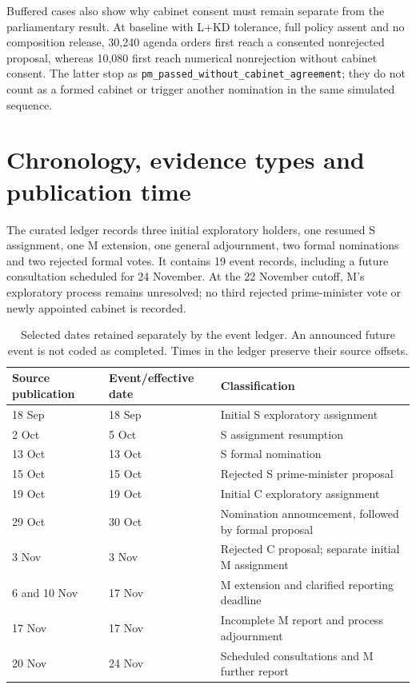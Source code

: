 Buffered cases also show why cabinet consent must remain separate from the parliamentary result. At baseline with L+KD tolerance, full policy assent and no composition release, 30,240 agenda orders first reach a consented nonrejected proposal, whereas 10,080 first reach numerical nonrejection without cabinet consent. The latter stop as \texttt{pm\_passed\_without\_cabinet\_agreement}; they do not count as a formed cabinet or trigger another nomination in the same simulated sequence.

\section{Chronology, evidence types and publication time}

The curated ledger records three initial exploratory holders, one resumed S assignment, one M extension, one general adjournment, two formal nominations and two rejected formal votes. It contains 19 event records, including a future consultation scheduled for 24 November. At the 22 November cutoff, M's exploratory process remains unresolved; no third rejected prime-minister vote or newly appointed cabinet is recorded.

\begin{table}[htbp]\centering
\caption{Selected dates retained separately by the event ledger. An announced future event is not coded as completed. Times in the ledger preserve their source offsets.}
\begin{tabularx}{\linewidth}{l l X}
\toprule
Source publication & Event/effective date & Classification\\
\midrule
18 Sep &18 Sep &Initial S exploratory assignment\\
2 Oct &5 Oct &S assignment resumption\\
13 Oct &13 Oct &S formal nomination\\
15 Oct &15 Oct &Rejected S prime-minister proposal\\
19 Oct &19 Oct &Initial C exploratory assignment\\
29 Oct &30 Oct &Nomination announcement, followed by formal proposal\\
3 Nov &3 Nov &Rejected C proposal; separate initial M assignment\\
6 and 10 Nov &17 Nov &M extension and clarified reporting deadline\\
17 Nov &17 Nov &Incomplete M report and process adjournment\\
20 Nov &24 Nov &Scheduled consultations and M further report\\
\bottomrule
\end{tabularx}
\end{table}

